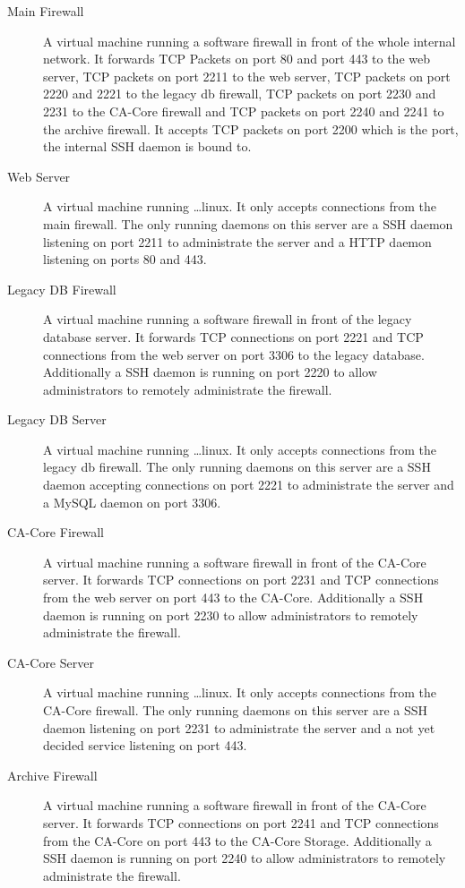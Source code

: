 \documentclass{article}
\begin{document}
\begin{description}
\item[Main Firewall] A virtual machine running a software firewall in front of the whole internal network. It forwards TCP Packets on port 80 and port 443 to the web server, TCP packets on port 2211 to the web server, TCP packets on port 2220 and 2221 to the legacy db firewall, TCP packets on port 2230 and 2231 to the CA-Core firewall and TCP packets on port 2240 and 2241 to the archive firewall. It accepts TCP packets on port 2200 which is the port, the internal SSH daemon is bound to.

\item[Web Server] A virtual machine running \dots linux. It only accepts connections from the main firewall. The only running daemons on this server are a SSH daemon listening on port 2211 to administrate the server and a HTTP daemon listening on ports 80 and 443.

\item[Legacy DB Firewall] A virtual machine running a software firewall in front of the legacy database server. It forwards TCP connections on port 2221 and TCP connections from the web server on port 3306 to the legacy database. Additionally a SSH daemon is running on port 2220 to allow administrators to remotely administrate the firewall.

\item[Legacy DB Server] A virtual machine running \dots linux. It only accepts connections from the legacy db firewall. The only running daemons on this server are a SSH daemon accepting connections on port 2221 to administrate the server and a MySQL daemon on port 3306.

\item[CA-Core Firewall] A virtual machine running a software firewall in front of the CA-Core server. It forwards TCP connections on port 2231 and TCP connections from the web server on port 443 to the CA-Core. Additionally a SSH daemon is running on port 2230 to allow administrators to remotely administrate the firewall.

\item[CA-Core Server] A virtual machine running \dots linux. It only accepts connections from the CA-Core firewall. The only running daemons on this server are a SSH daemon listening on port 2231 to administrate the server and a not yet decided service listening on port 443.

\item[Archive Firewall] A virtual machine running a software firewall in front of the CA-Core server. It forwards TCP connections on port 2241 and TCP connections from the CA-Core on port 443 to the CA-Core Storage. Additionally a SSH daemon is running on port 2240 to allow administrators to remotely administrate the firewall.


\end{description}
\end{document}
